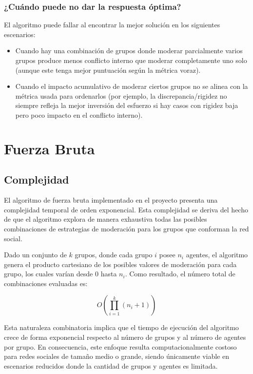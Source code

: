 \subsubsection{¿Cuándo puede no dar la respuesta óptima?}

El algoritmo puede fallar al encontrar la mejor solución en los siguientes escenarios:

\begin{itemize}
	\item Cuando hay una combinación de grupos donde moderar parcialmente varios grupos produce menos conflicto interno que moderar completamente uno solo (aunque este tenga mejor puntuación según la métrica voraz).

	\item Cuando el impacto acumulativo de moderar ciertos grupos no se alinea con la métrica usada para ordenarlos (por ejemplo, la discrepancia/rigidez no siempre refleja la mejor inversión del esfuerzo si hay casos con rigidez baja pero poco impacto en el conflicto interno).
\end{itemize}

\section{Fuerza Bruta}

\subsection{Complejidad}

El algoritmo de fuerza bruta implementado en el proyecto presenta una complejidad temporal de orden exponencial. Esta complejidad se deriva del hecho de que el algoritmo explora de manera exhaustiva todas las posibles combinaciones de estrategias de moderación para los grupos que conforman la red social.

Dado un conjunto de $k$ grupos, donde cada grupo $i$ posee $n_i$ agentes, el algoritmo genera el producto cartesiano de los posibles valores de moderación para cada grupo, los cuales varían desde $0$ hasta $n_i$. Como resultado, el número total de combinaciones evaluadas es:

\begin{equation}
	O \left(\prod_{ i = 1 }^k (n_i + 1) \right )
\end{equation}

Esta naturaleza combinatoria implica que el tiempo de ejecución del algoritmo crece de forma exponencial respecto al número de grupos y al número de agentes por grupo. En consecuencia, este enfoque resulta computacionalmente costoso para redes sociales de tamaño medio o grande, siendo únicamente viable en escenarios reducidos donde la cantidad de grupos y agentes es limitada.

